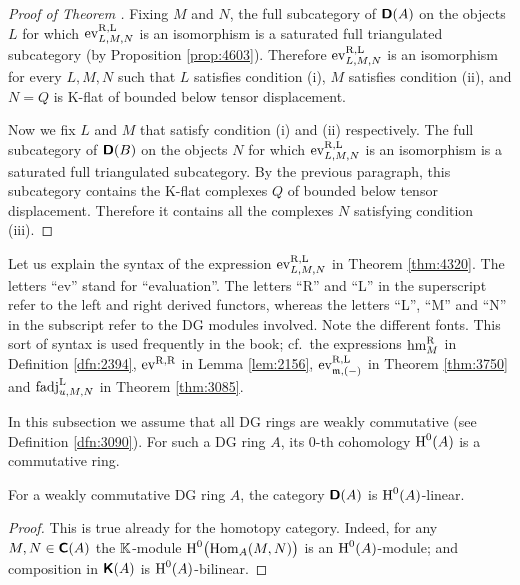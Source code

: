 \begin{proof}[Proof of Theorem \tup{\ref{thm:4320}}]
Fixing $M$ and $N$, the full subcategory of $\boldsymbol{\mathsf{D}}(A)$
on the objects $L$ for which $\operatorname{ev}^{\mathrm{R, L}}_{L, M, N}$ is an 
isomorphism is a saturated full triangulated subcategory (by Proposition 
\ref{prop:4603}). Therefore  
$\operatorname{ev}^{\mathrm{R, L}}_{L, M, N}$ is an isomorphism for every $L, M, N$ 
such that $L$ satisfies condition (i), $M$ satisfies condition (ii), and 
$N = Q$ is K-flat of bounded below tensor displacement.

Now we fix $L$ and $M$ that satisfy condition (i) and (ii) respectively. 
The full subcategory of $\boldsymbol{\mathsf{D}}(B)$ on the objects $N$ for which 
$\operatorname{ev}^{\mathrm{R, L}}_{L, M, N}$ is an 
isomorphism is a saturated full triangulated subcategory. By the previous 
paragraph, this subcategory contains the K-flat complexes $Q$ of bounded below 
tensor displacement. Therefore it contains all the complexes $N$ satisfying 
condition (iii).
\end{proof}


\begin{rem} \label{rem:4677}
Let us explain the syntax of the expression 
$\operatorname{ev}^{\mathrm{R, L}}_{L, M, N}$
in Theorem \ref{thm:4320}. The letters ``ev'' stand for ``evaluation''.
The letters ``R'' and ``L'' in the superscript refer to the 
left and right derived functors, whereas the letters ``L'', ``M'' and ``N'' 
in the subscript refer to the DG modules involved. Note the different fonts. 
This sort of syntax is used frequently in the book; cf.\ the expressions 
$\operatorname{hm}^{\mathrm{R}}_{M}$ in Definition \ref{dfn:2394},
$\operatorname{ev}^{\mathrm{R, R}}$ in Lemma \ref{lem:2156},
$\operatorname{ev}^{\mathrm{R, L}}_{\mathfrak{m}, (-)}$ in Theorem \ref{thm:3750} and
$\operatorname{fadj}_{u, M, N}^{\mathrm{L}}$ in Theorem \ref{thm:3085}.
\end{rem}



\label{subsec:adjs-comm}

In this subsection we assume that all DG rings are weakly commutative  
(see Definition \ref{dfn:3090}).
For such a DG ring $A$, its $0$-th cohomology 
$\operatorname{H}^0(A)$ is a commutative ring.
 
\begin{prop} \label{prop:3107}
For a weakly commutative DG ring $A$, the category $\boldsymbol{\mathsf{D}}(A)$ is 
$\operatorname{H}^0(A)$-linear. 
\end{prop}

\begin{proof}
This is true already for the homotopy category. 
Indeed, for any $M, N \in \boldsymbol{\mathsf{C}}(A)$ the 
$\mathbb{K}$-module 
$\operatorname{H}^0 \bigl( \operatorname{Hom}_A(M, N) \bigr)$
is an $\operatorname{H}^0(A)$-module; and composition in $\boldsymbol{\mathsf{K}}(A)$ is 
$\operatorname{H}^0(A)$-bilinear. 
\end{proof}

